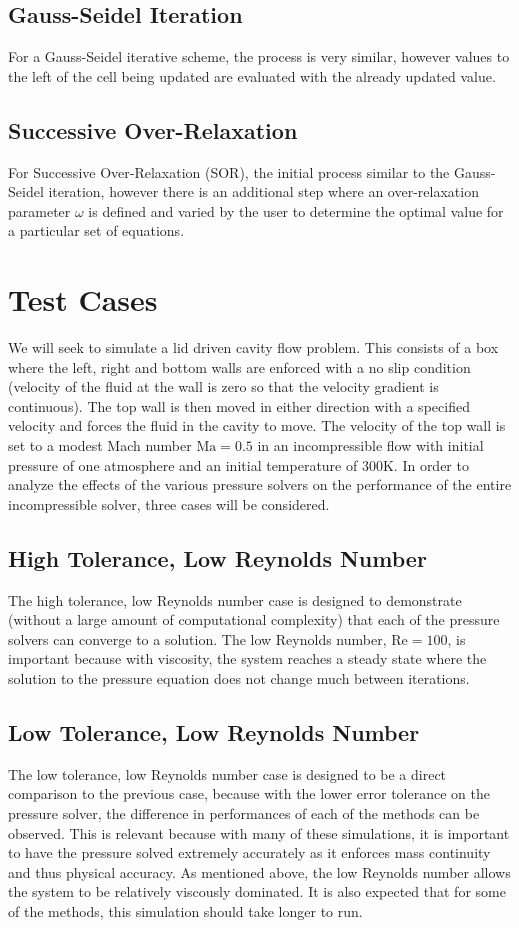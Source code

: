 \documentclass{homework}
\begin{document}
\subsection{Gauss-Seidel Iteration}
For a Gauss-Seidel iterative scheme, the process is very similar, however values to the left of the cell being updated are evaluated with the already updated value.

\subsection{Successive Over-Relaxation}
For Successive Over-Relaxation (SOR), the initial process similar to the Gauss-Seidel iteration, however there is an additional step where an over-relaxation parameter $\omega$ is defined and varied by the user to determine the optimal value for a particular set of equations.

\section{\textbf{Test Cases}}
\noindent We will seek to simulate a lid driven cavity flow problem. This consists of a box where the left, right and bottom walls are enforced with a no slip condition (velocity of the fluid at the wall is zero so that the velocity gradient is continuous). The top wall is then moved in either direction with a specified velocity and forces the fluid in the cavity to move. The velocity of the top wall is set to a modest Mach number $\textrm{Ma} = 0.5$ in an incompressible flow with initial pressure of one atmosphere and an initial temperature of 300K. In order to analyze the effects of the various pressure solvers on the performance of the entire incompressible solver, three cases will be considered.

\subsection{High Tolerance, Low Reynolds Number}
The high tolerance, low Reynolds number case is designed to demonstrate (without a large amount of computational complexity) that each of the pressure solvers can converge to a solution. The low Reynolds number, $\textrm{Re} = 100$, is important because with viscosity, the system reaches a steady state where the solution to the pressure equation does not change much between iterations.

\subsection{Low Tolerance, Low Reynolds Number}
The low tolerance, low Reynolds number case is designed to be a direct comparison to the previous case, because with the lower error tolerance on the pressure solver, the difference in performances of each of the methods can be observed. This is relevant because with many of these simulations, it is important to have the pressure solved extremely accurately as it enforces mass continuity and thus physical accuracy. As mentioned above, the low Reynolds number allows the system to be relatively viscously dominated. It is also expected that for some of the methods, this simulation should take longer to run.
\end{document}
